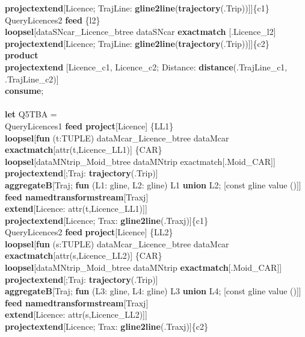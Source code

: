 \documentclass[a4paper]{article}
\newcommand{\op}[1]{\textbf{#1}}
\begin{document}
\begin{scriptsize}
\begin{tabbing}
\>\>\>\op{projectextend}[Licence; TrajLine: \op{gline2line}(\op{trajectory}(.Trip))]]\{c1\}\\
\>QueryLicences2 \op{feed} \{l2\}\\
\>\>\op{loopsel}[dataSNcar\_Licence\_btree dataSNcar \op{exactmatch} [.Licence\_l2]\\
\>\>\>\op{projectextend}[Licence; TrajLine: \op{gline2line}(\op{trajectory}(.Trip))]]\{c2\}\\
\>\op{product}\\
\>\op{projectextend} [Licence\_c1, Licence\_c2; Distance: \op{distance}(.TrajLine\_c1, .TrajLine\_c2)]\\
\op{consume};\\
\\
\op{let} Q5TBA =\\
\>QueryLicences1 \op{feed project}[Licence] \{LL1\}\\
\>\>\op{loopsel}[\op{fun} (t:TUPLE) dataMcar\_Licence\_btree dataMcar \op{exactmatch}[attr(t,Licence\_LL1)] \{CAR\}\\
\>\>\>\op{loopsel}[dataMNtrip\_Moid\_btree dataMNtrip exactmatch[.Moid\_CAR]]\\
\>\>\>\op{projectextend}[;Traj: \op{trajectory}(.Trip)]\\
\>\>\>\op{aggregateB}[Traj; \op{fun} (L1: gline, L2: gline) L1 \op{union} L2; [const gline value ()]]\\
\>\>\>\op{feed namedtransformstream}[Traxj]\\
\>\>\>\op{extend}[Licence: attr(t,Licence\_LL1)]]\\
\>\>\op{projectextend}[Licence; Trax: \op{gline2line}(.Traxj)]\{c1\}\\
\>QueryLicences2 \op{feed} \op{project}[Licence] \{LL2\}\\
\>\>\op{loopsel}[\op{fun} (s:TUPLE) dataMcar\_Licence\_btree dataMcar \op{exactmatch}[attr(s,Licence\_LL2)] \{CAR\}\\
\>\>\>\op{loopsel}[dataMNtrip\_Moid\_btree dataMNtrip \op{exactmatch}[.Moid\_CAR]]\\
\>\>\>\op{projectextend}[;Traj: \op{trajectory}(.Trip)]\\
\>\>\>\op{aggregateB}[Traj; \op{fun} (L3: gline, L4: gline) L3 \op{union} L4; [const gline value ()]]\\
\>\>\>\op{feed namedtransformstream}[Traxj]\\
\>\>\>\op{extend}[Licence: attr(s,Licence\_LL2)]]\\
\>\>\op{projectextend}[Licence; Trax: \op{gline2line}(.Traxj)]\{c2\}\\

\end{tabbing}
\end{scriptsize}
\end{document}
